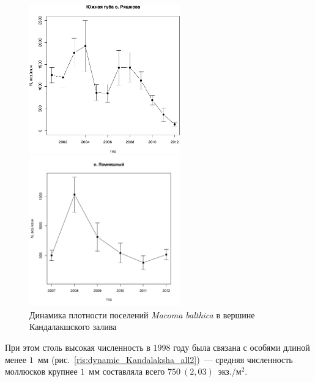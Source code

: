 \begin{figure}[p]
	\begin{minipage}[b]{.46\linewidth}
	\begin{center}
		\includegraphics[width=65mm]{../White_Sea/Ryashkov_YuG/N_dynamic1.pdf}
	\end{center}
	\end{minipage}
%
	\hfil %
%
	\begin{minipage}[b]{.46\linewidth}
	\begin{center}
		\includegraphics[width=65mm]{../White_Sea/Lomnishniy/N_dynamic1.pdf}
	\end{center}
	\end{minipage}



	\caption{Динамика плотности поселений {\it Macoma balthica} в вершине Кандалакшского залива}
	\label{ris:dynamic_Kandalaksha_all}
	\end{figure}
При этом столь высокая численность в $1998$ году была связана с особями длиной менее $1$~мм (рис.~\ref{ris:dynamic_Kandalaksha_all2})~--- средняя численность моллюсков крупнее $1$~мм составляла всего $750~(2,03)$~экз./м$^2$.
